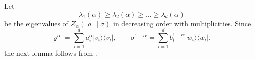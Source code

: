 \documentclass[unsortedaddress,superscriptaddress,pra,notitlepage]{revtex4}
\def\rho{\varrho}
\def\<{\langle}
\def\>{\rangle}
\def\Um{\mathrm{Um}}
\def\<{\langle}
\def\>{\rangle}
\DeclareMathOperator{\Tr}{Tr}
\begin{document}


Let
\[
\lambda_1(\alpha)\ge\lambda_2(\alpha)\ge\ldots\ge\lambda_d(\alpha)
\]
be the eigenvalues of $Z_\alpha(\rho\|\sigma)$ in decreasing order with multiplicities.
Since
\[
\rho^\alpha=\sum_{i=1}^da_i^\alpha|v_i\>\<v_i|,\qquad
\sigma^{1-\alpha}=\sum_{i=1}^db_i^{1-\alpha}|w_i\>\<w_i|,
\]
the next lemma follows from \cite[Theorem 3.1]{AH2019}.
\end{document}
